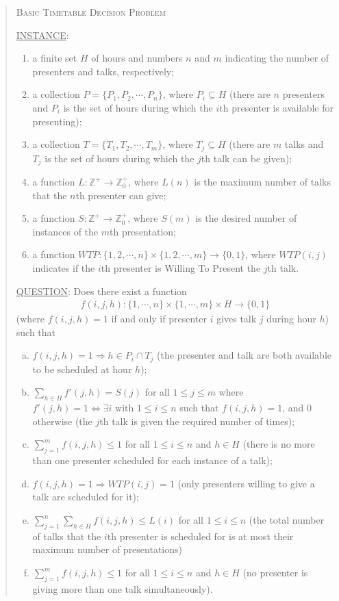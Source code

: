 \documentclass{svjour3}                     %
\begin{document}
\begin{quote}
	\textsc{Basic Timetable Decision Problem}
	
	\underline{INSTANCE}:
	\begin{enumerate}
		\item a finite set $H$ of hours and numbers $n$ and $m$ indicating the number of presenters and talks, respectively; 
		\item a collection $P = \{P_1, P_2, \cdots, P_n\}$, where $P_i \subseteq H$ (there are $n$ presenters and $P_i$ is the set of hours during which the $i$th presenter is available for presenting);
		\item a collection $T = \{T_1, T_2, \cdots, T_m\}$, where $T_j \subseteq H$ (there are $m$ talks and $T_j$ is the set of hours during which the $j$th talk can be given);
		\item a function $L : \mathbb Z^+ \rightarrow \mathbb Z_0^+$, where $L(n)$ is the maximum number of talks that the $n$th presenter can give;
		\item a function $S : \mathbb Z^+ \rightarrow \mathbb Z_0^+$, where $S(m)$ is the desired number of instances of the $m$th presentation;
		\item a function $WTP : \{1,2,\cdots, n\} \times \{1,2,\cdots,m\} \rightarrow \{0,1\}$, where $WTP(i,j)$ indicates if the $i$th presenter is Willing To Present the $j$th talk.
	\end{enumerate}
	\underline{QUESTION}: Does there exist a function 
	\begin{gather*}
		f(i,j,h) : \{1,\cdots,n\} \times \{1,\cdots,m\} \times H \rightarrow \{0,1\}
	\end{gather*}
	(where $f(i,j,h)=1$ if and only if presenter $i$ gives talk $j$ during hour $h$) such that
	\begin{enumerate}[(a)]
		\item $f(i,j,h) = 1 \Rightarrow h \in P_i \cap T_j$ (the presenter and talk are both available to be scheduled at hour $h$);
		\item $\sum\limits_{h \in H} f'(j,h) = S(j)$ for all $1 \le j \le m$ where $f'(j,h) = 1 \iff \exists i \text{ with } 1 \le i \le n$ such that $f(i,j,h)=1$, and 0 otherwise (the $j$th talk is given the required number of times);
		\item $\sum\limits_{j=1}^{m} f(i,j,h) \le 1$ for all $1 \le i \le n$ and $h \in H$ (there is no more than one presenter scheduled for each instance of a talk);
		\item $f(i,j,h) = 1 \Rightarrow WTP(i,j) = 1$ (only presenters willing to give a talk are scheduled for it);
		\item $\sum\limits_{j=1}^n\sum\limits_{h \in H} f(i,j,h) \le L(i)$ for all $1 \le i \le n$ (the total number of talks that the $i$th presenter is scheduled for is at most their maximum number of presentations)
		\item $\sum\limits_{j=1}^m f(i,j,h) \le 1$ for all $1 \le i \le n$ and $h \in H$ (no presenter is giving more than one talk simultaneously).
	\end{enumerate}
\end{quote}
\end{document}
